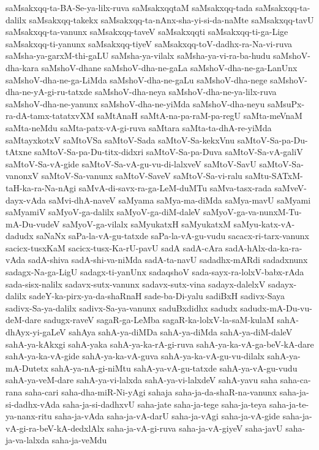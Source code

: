 {saMsakxqq-ta-BA-Se-ya-lilx-ruva
saMsakxqqtaM
saMsakxqq-tada
saMsakxqq-ta-dalilx
saMsakxqq-takekx
saMsakxqq-ta-nAnx-sha-yi-si-da-naMte
saMsakxqq-tavU
saMsakxqq-ta-vanunx
saMsakxqq-taveV
saMsakxqqti
saMsakxqq-ti-ga-Lige
saMsakxqq-ti-yanunx
saMsakxqq-tiyeV
saMsakxqq-toV-dadhx-ra-Na-vi-ruva
saMsha-ya-garxM-thi-gaLU
saMsha-ya-vilalx
saMsha-ya-vi-ra-ba-hudu
saMshoV-dha-kara
saMshoV-dhane
saMshoV-dha-ne-gaLa
saMshoV-dha-ne-ga-LanUnx
saMshoV-dha-ne-ga-LiMda
saMshoV-dha-ne-gaLu
saMshoV-dha-nege
saMshoV-dha-ne-yA-gi-ru-tatxde
saMshoV-dha-neya
saMshoV-dha-ne-ya-lilx-ruva
saMshoV-dha-ne-yanunx
saMshoV-dha-ne-yiMda
saMshoV-dha-neyu
saMsuPx-ra-dA-tamx-tatatxvXM
saMtAnaH
saMtA-na-pa-raM-pa-regU
saMta-meVnaM
saMta-neMdu
saMta-patx-vA-gi-ruva
saMtara
saMta-ta-dhA-re-yiMda
saMtayxkotxV
saMtoVSa
saMtoV-Sada
saMtoV-Sa-kekxVnu
saMtoV-Sa-pa-Du-tAtxne
saMtoV-Sa-pa-Du-titx-didxri
saMtoV-Sa-pa-Duva
saMtoV-Sa-vA-galiV
saMtoV-Sa-vA-gide
saMtoV-Sa-vA-gu-vu-di-lalxveV
saMtoV-SavU
saMtoV-Sa-vanonxV
saMtoV-Sa-vanunx
saMtoV-SaveV
saMtoV-Sa-vi-ralu
saMtu-SATxM-taH-ka-ra-Na-nAgi
saMvA-di-savx-ra-ga-LeM-duMTu
saMva-tasx-rada
saMveV-dayx-vAda
saMvi-dhA-naveV
saMyama
saMya-ma-diMda
saMya-mavU
saMyami
saMyamiV
saMyoV-ga-dalilx
saMyoV-ga-diM-daleV
saMyoV-ga-va-nunxM-Tu-mA-Du-vudeV
saMyoV-ga-vilalx
saMyukatxH
saMyukatxM
saMyu-katx-vA-dadudx
saNaNx
saPa-la-vA-gu-tatxde
saPa-la-vA-gu-vudu
sacacx-ri-tarx-vanunx
sacicx-tusxKaM
sacicx-tusx-Ka-rU-pavU
sadA
sadA-cAra
sadA-hAlx-da-ka-ra-vAda
sadA-shiva
sadA-shi-va-niMda
sadA-ta-navU
sadadhx-mARdi
sadadxnunx
sadagx-Na-ga-LigU
sadagx-ti-yanUnx
sadaqshoV
sada-sayx-ra-lolxV-babx-rAda
sada-sisx-nalilx
sadavx-sutx-vanunx
sadavx-sutx-vina
sadayx-dalelxV
sadayx-dalilx
sadeY-ka-pirx-ya-da-shaRnaH
sade-ba-Di-yalu
sadiBxH
sadivx-Saya
sadivx-Sa-ya-dalilx
sadivx-Sa-ya-vanunx
saduBxdidhx
sadudx
sadudx-mA-Du-vu-deM-dare
sadugx-raveV
sagaR-ga-LeMba
sagaR-ka-lolxV-la-saM-kulaM
sahA-dhAyx-yi-gaLeV
sahAya
sahA-ya-diMDa
sahA-ya-diMda
sahA-ya-diM-daleV
sahA-ya-kAkxgi
sahA-yaka
sahA-ya-ka-rA-gi-ruva
sahA-ya-ka-vA-ga-beV-kA-dare
sahA-ya-ka-vA-gide
sahA-ya-ka-vA-guva
sahA-ya-ka-vA-gu-vu-dilalx
sahA-ya-mA-Dutetx
sahA-ya-nA-gi-niMtu
sahA-ya-vA-gu-tatxde
sahA-ya-vA-gu-vudu
sahA-ya-veM-dare
sahA-ya-vi-lalxda
sahA-ya-vi-lalxdeV
sahA-yavu
saha
saha-ca-rana
saha-cari
saha-dha-miR-Ni-yAgi
sahaja
saha-ja-da-shaR-na-vanunx
saha-ja-si-dadhx-vAda
saha-ja-si-dadhxvU
saha-jate
saha-ja-tege
saha-ja-teya
saha-ja-te-ya-nanx-ritu
saha-ja-vAda
saha-ja-vA-darU
saha-ja-vAgi
saha-ja-vA-gide
saha-ja-vA-gi-ra-beV-kA-dedxlAlx
saha-ja-vA-gi-ruva
saha-ja-vA-giyeV
saha-javU
saha-ja-va-lalxda
saha-ja-veMdu
}
